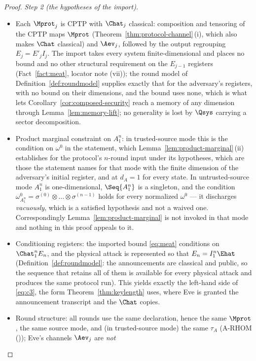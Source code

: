 \begin{proof}
\emph{Step 2 (the hypotheses of the import).}
\begin{itemize}[leftmargin=1.6em]
\item Each $\Mprot_j$ is CPTP with $\Chat_j$ classical: composition and
tensoring of the CPTP maps $\Mprot$ (Theorem~\ref{thm:protocol-channel}\,(i), which
also makes $\Chat$ classical) and $\Aev_j$, followed by the output
regrouping $E_j=E'_jI_j$. The import takes every system
finite-dimensional and places no bound and no other structural
requirement on the $E_{j-1}$ registers (Fact~\ref{fact:meat}, locator
note (vii)); the round model of Definition~\ref{def:roundmodel} supplies
exactly that for the adversary's registers, with no bound on their
dimensions, and the bound uses none, which is what lets
Corollary~\ref{cor:composed-security} reach a memory of any dimension through
Lemma~\ref{lem:memory-lift}; no generality is lost by $\Qsys$ carrying a
sector decomposition.
\item Product marginal constraint on $A_1^n$: in trusted-source mode
this is the condition on $\omega^{0}$ in the statement, which
Lemma~\ref{lem:product-marginal}\,(ii) establishes for the protocol's
$n$-round input under its hypotheses, which are those the statement names
for that mode with the finite dimension of the adversary's initial
register, and at $d_A=1$ for every state. In
untrusted-source mode
$A_1^n$ is one-dimensional, $\Seq{A_1^n}$ is a singleton, and the
condition
$\omega^{0}_{A_1^n}=\sigma^{(0)}\otimes\dots\otimes\sigma^{(n-1)}$
holds for every normalized $\omega^{0}$ --- it discharges
\emph{vacuously}, which is a satisfied hypothesis and not a waived one.
Correspondingly
Lemma~\ref{lem:product-marginal} is not invoked in that mode and nothing
in this proof appeals to it.
\item Conditioning registers: the imported bound \eqref{eq:meat}
conditions on $\Chat_1^nE_n$, and the physical attack is represented
so that $E_n=I_1^n\Ehat$ (Definition~\ref{def:roundmodel}: the
announcements are classical and public, so the sequence that retains
all of them is available for every physical attack and produces the
same protocol run). This yields exactly the left-hand side of
\eqref{eq:c3}, the form Theorem~\ref{thm:keylength} uses, where Eve is
granted the announcement transcript and the $\Chat$ copies.
\item Round structure: all rounds use the same declaration, hence the
same $\Mprot$, the same source mode, and (in trusted-source mode) the
same $\tau_A$
(A-RHOM ()); Eve's channels $\Aev_j$ are \emph{not}

\end{itemize}
\end{proof}
